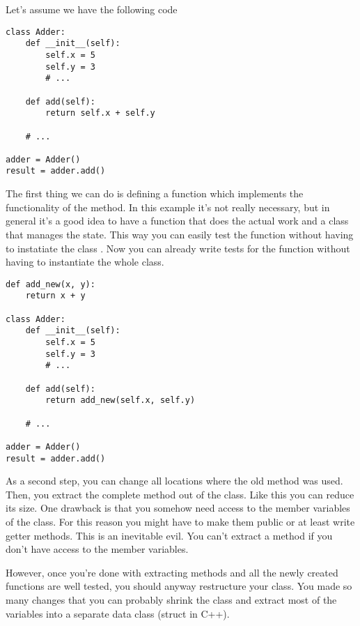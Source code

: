 Let's assume we have the following code

\begin{programcode}{}
\begin{verbatim}
class Adder:
    def __init__(self):
        self.x = 5
        self.y = 3
        # ...

    def add(self):
        return self.x + self.y
    
    # ...

adder = Adder()
result = adder.add()
\end{verbatim}
\end{programcode}

The first thing we can do is defining a function  which implements the functionality of the  method. In this example it's not really necessary, but in general it's a good idea to have a function that does the actual work and a class that manages the state. This way you can easily test the function  without having to instatiate the class . Now you can already write tests for the function without having to instantiate the whole class.

\begin{programcode}{}
\begin{verbatim}
def add_new(x, y):
    return x + y

class Adder:
    def __init__(self):
        self.x = 5
        self.y = 3
        # ...

    def add(self):
        return add_new(self.x, self.y)
    
    # ...

adder = Adder()
result = adder.add()
\end{verbatim}
\end{programcode}

As a second step, you can change all locations where the old  method was used. Then, you extract the complete method out of the class. Like this you can reduce its size. One drawback is that you somehow need access to the member variables of the class. For this reason you might have to make them public or at least write getter methods. This is an inevitable evil. You can't extract a method if you don't have access to the member variables.

However, once you're done with extracting methods and all the newly created functions are well tested, you should anyway restructure your class. You made so many changes that you can probably shrink the class and extract most of the variables into a separate data class (struct in C++).


